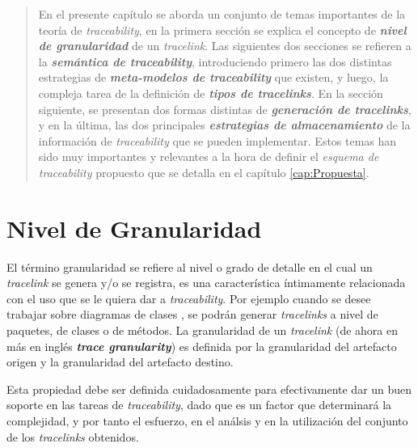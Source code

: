 \documentclass[a4paper,12pt,oneside,spanish]{book}
\begin{document}
\begin{quotation}

En el presente capítulo se aborda un conjunto de temas importantes de la teoría de \textit{traceability}, en la primera sección se explica el concepto de \textit{\textbf{nivel de granularidad}} de un \textit{tracelink}. Las siguientes dos secciones se refieren a la \textit{\textbf{semántica de traceability}}, introduciendo primero las dos distintas estrategias de \textit{\textbf{meta-modelos de traceability}} que existen, y luego, la compleja tarea de la definición de \textit{\textbf{tipos de tracelinks}}. En la sección siguiente, se presentan dos formas distintas de \textit{\textbf{generación de tracelinks}}, y en la última, las dos principales \textit{\textbf{estrategias de almacenamiento}}  de la información de \textit{traceability} que se pueden implementar. Estos temas han sido muy importantes y relevantes a la hora de definir el \textit{esquema de traceability} propuesto que se detalla en el capítulo \ref{cap:Propuesta}.

\end{quotation}


\bigskip


\minitoc 


\pagebreak


\section{Nivel de Granularidad}
\label{sec:NivelGranularidad}

El término granularidad se refiere al nivel o grado de detalle en el cual un \textit{tracelink} se genera y/o se registra, es una característica íntimamente relacionada con el uso que se le quiera dar a \textit{traceability}. Por ejemplo cuando se desee trabajar sobre diagramas de clases , se podrán generar \textit{tracelinks} a nivel de paquetes, de clases o de métodos. La granularidad de un \textit{tracelink} (de ahora en más en inglés \textit{\textbf{trace granularity}}) es definida por la granularidad del artefacto origen y la granularidad del artefacto destino.

Esta propiedad debe ser definida cuidadosamente para efectivamente dar un buen soporte en las tareas de \textit{traceability}, dado que es un factor que determinará la complejidad, y por tanto el esfuerzo, en el análsis y en la utilización del conjunto de los \textit{tracelinks} obtenidos.
\end{document}
